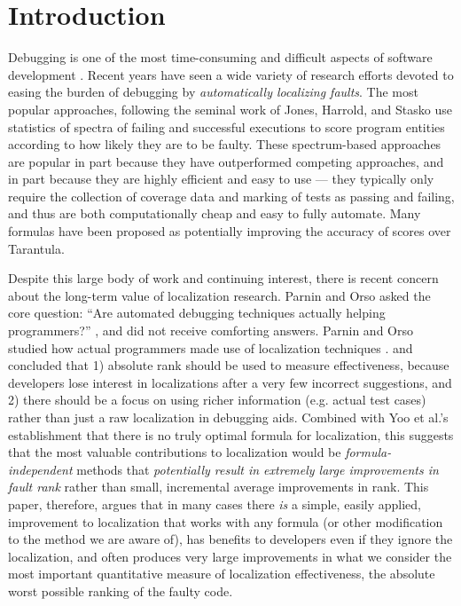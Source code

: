 \section{Introduction}

Debugging is one of the most time-consuming and difficult aspects of
software development \cite{Vesey,BallVis}.  Recent years have seen a
wide variety of research efforts devoted to easing the burden of
debugging by \emph{automatically localizing faults}.  The most popular
approaches, following the seminal work of Jones, Harrold, and Stasko
\cite{Jones2002,Tarantula} use statistics of spectra \cite{RepsSpectra} of
failing and successful executions to score program entities according
to how likely they are to be faulty.  These spectrum-based approaches
are popular in part because they have outperformed competing
approaches, and in part because they are highly efficient and easy to
use --- they typically only require the collection of coverage data
and marking of tests as passing and failing, and thus are both
computationally cheap and easy to fully automate.  Many formulas have
been proposed as potentially improving the accuracy of scores
\cite{Ochai,AMPLE,Pinpoint,StatDebug,Abreu:2006:PRDC} over Tarantula.

Despite this large body of work and continuing interest, there is recent concern about the long-term value
of localization research.  Parnin and Orso asked the core
question: ``Are automated debugging techniques actually helping
programmers?''  \cite{AutoHelp}, and did not receive comforting
answers.  Parnin and Orso studied how actual programmers made use of localization techniques \cite{AutoHelp}.
and concluded that 1) absolute rank should be used to
measure effectiveness, because developers lose interest in
localizations after a very few incorrect suggestions, and 2) there should be a focus on
using richer information (e.g. actual test cases) rather than just
a raw localization in debugging aids.  Combined with Yoo et al.'s
establishment \cite{yoo2014no} that there is no truly optimal formula
for localization, this suggests that the most valuable contributions
to localization would be \emph{formula-independent} methods that
\emph{potentially result in extremely large improvements in fault
rank} rather than small, incremental average improvements in rank.
This paper, therefore, argues that in many cases there \emph{is} a
simple, easily applied, improvement to localization that works with
any formula (or other modification to the method we are aware of), has
benefits to developers even if they ignore the localization, and often
produces very large improvements in what we consider the most
important quantitative measure of localization effectiveness, the absolute worst
possible ranking of the faulty code.

